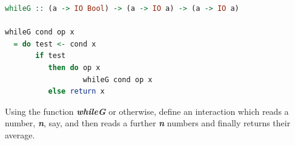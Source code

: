 \documentclass{article}
\begin{document}
\begin{solution}
\begin{lstlisting}[language=Haskell]
whileG :: (a -> IO Bool) -> (a -> IO a) -> (a -> IO a)

whileG cond op x
  = do test <- cond x
       if test
          then do op x
                  whileG cond op x
          else return x
 \end{lstlisting}
 \end{solution}

\begin{exercise} 
Using the function \textit{\textbf{whileG}} or otherwise, define an interaction which reads a number, \textit{\textbf{n}}, say, and then reads a further \textit{\textbf{n}} numbers and finally returns their average.  
\end{exercise} 
\end{document}
